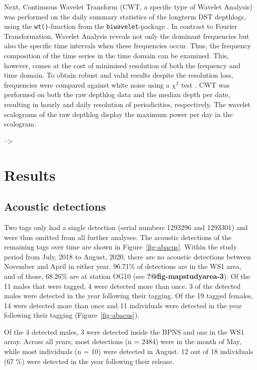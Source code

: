\documentclass[
  authoryear,
  review,
  3p]{elsarticle}
\begin{document}
Next, Continuous Wavelet Transform (CWT, a specific type of Wavelet
Analysis) was performed on the daily summary statistics of the longterm
DST depthlogs, using the \texttt{wt()}-function from the
\texttt{biwavelet}-package \citep{biwavelet}. In contrast to Fourier
Transformation, Wavelet Analysis reveals not only the dominant
frequencies but also the specific time intervals when these frequencies
occur. Thus, the frequency composition of the time series in the time
domain can be examined. This, however, comes at the cost of minimised
resolution of both the frequency and time domain. To obtain robust and
valid results despite the resolution loss, frequencies were compared
against white noise using a \(\chi^2\) test \citep{grinsted_2004}. CWT
was performed on both the raw depthlog data and the median depth per
date, resulting in hourly and daily resolution of periodicities,
respectively. The wavelet scalograms of the raw depthlog display the
maximum power per day in the scalogram.

--\textgreater{}

\hypertarget{sec-results}{%
\section{Results}\label{sec-results}}

\hypertarget{sec-res-acoustic}{%
\subsection{Acoustic detections}\label{sec-res-acoustic}}

Two tags only had a single detection (serial numbers 1293296 and
1293301) and were thus omitted from all further analyses. The acoustic
detections of the remaining tags over time are shown in
Figure~\ref{fig-abacus}. Within the study period from July, 2018 to
August, 2020, there are no acoustic detections between November and
April in either year. 96.71\% of detections are in the WS1 area, and of
those, 68.26\% are at station OG10 (see \textbf{?@fig-mapstudyarea-3}).
Of the 11 males that were tagged, 4 were detected more than once. 3 of
the detected males were detected in the year following their tagging. Of
the 19 tagged females, 14 were detected more than once and 11
individuals were detected in the year following their tagging
(Figure~\ref{fig-abacus}).

Of the 4 detected males, 3 were detected inside the BPNS and one in the
WS1 array. Across all years, most detections (n = 2484) were in the
month of May, while most individuals (n = 10) were detected in August.
12 out of 18 individuals (67 \%) were detected in the year following
their release.
\end{document}
